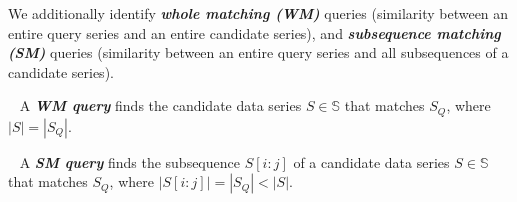 %
We additionally identify %
\textit{\textbf{whole matching (WM)}} queries (similarity between an entire query series and an entire candidate series), and 
\textit{\textbf{subsequence matching (SM)}} queries (similarity between an entire query series and all subsequences of a candidate series).

\vspace*{-0.1cm}
\begin{defn}~\cite{journal/pvldb/echihabi2018} \label{def:wholematch}
	A \textit{\textbf{WM query}} finds the candidate data series $S \in \mathbb{S}$ that matches $S_Q$, where $|S|=|S_Q|$. 
\end{defn}
\vspace*{-0.3cm}
\begin{defn}~\cite{journal/pvldb/echihabi2018} \label{def:submatch}
	A \textit{\textbf{SM query}} finds the subsequence $S[i:j]$ of a candidate data series $S \in \mathbb{S}$ that matches $S_Q$, where $|S[i:j]| = |S_Q| < |S|$.
\end{defn}
\vspace*{-0.1cm}



